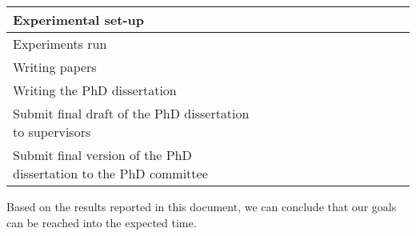 \documentclass[authoryear,11pt]{elsarticle}
\begin{document}
\begin{table}[h!]
\begin{tabular}{|p{7cm}|c|c|c|c|c|c|c|c|c|c|c|c|}
		\hline
		Experimental set-up &\cellcolor{blue}&\cellcolor{blue}&&\cellcolor{blue}&
		\cellcolor{blue}&&\cellcolor[gray]{0.9}&\cellcolor[gray]{0.9}&&&&\\
		\hline
		Experiments run &&&\cellcolor{blue}&\cellcolor{blue}&&\cellcolor{blue}&\cellcolor[gray]{0.9}&&
		\cellcolor[gray]{0.9}&&&\\
		\hline
		Writing papers &\cellcolor{blue}&&\cellcolor{blue}&&\cellcolor{blue}&\cellcolor{blue}&&&
		\cellcolor[gray]{0.9}&&&\\
		\hline
		Writing the PhD dissertation &&&&\cellcolor{blue}&\cellcolor{blue}&\cellcolor{blue}&
		\cellcolor[gray]{0.9}&\cellcolor[gray]{0.9}&\cellcolor[gray]{0.9}&&&\\
		\hline
		Submit final draft of the PhD dissertation to supervisors &&&&&&&&&&\cellcolor[gray]{0.9}&&\\
		\hline
		Submit final version of the PhD dissertation to the PhD committee &&&&&&&&&&&\cellcolor[gray]{0.9}&\\
		\hline
		
 	\end{tabular}             
 \end{table}
 
   Based on the results reported in this document, we can conclude that our goals can be reached into the expected time.
	  	


	

{}

\end{document}
